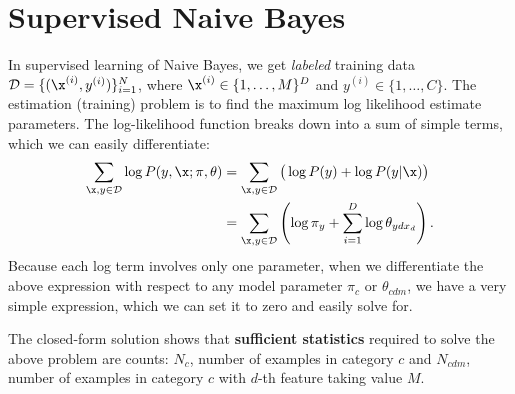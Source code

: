 \documentclass{discussion}
\begin{document}


\newcommand{\D}{\mathcal{D}}
\section{Supervised Naive Bayes}
In supervised learning of Naive Bayes, we get \emph{labeled} training data $\D = \{(\x^{(i)}, y^{(i)})\}_{i=1}^{N}$, where $\x^{(i)} \in \{1,\ldots,M\}^{D}$ and $y^{(i)} \in \{ 1,\ldots, C\}$. 
 The estimation (training) problem is to find the maximum log likelihood estimate parameters. The log-likelihood function breaks down into a sum of simple terms, which we can easily differentiate: 
\begin{align}
	\sum_{\x,y \in \mathcal{D}} \log P(y, \x; \pi, \theta)
	&= \sum_{\x,y \in \mathcal{D}} \big( \log P({y}) + \log P(y | \x)\big) \label{eq:mle} \\ 
	&= \sum_{\x,y \in \mathcal{D}} \left( \log \pi_{y} + \sum_{i=1}^{D}\log \theta_{ydx_d} \right). \label{eq:mle-param}
\end{align}
Because each log term involves only one parameter, when we differentiate the above expression with respect to any model parameter $\pi_c$ or $\theta_{cdm}$, we have a very simple expression, which we can set it to zero and easily solve for.

The closed-form solution shows that \textbf{sufficient statistics} required to solve the above problem are counts: $N_c$, number of examples in category $c$ and $N_{cdm}$, number of examples in category $c$ with $d$-th feature taking value $M$. 
\end{document}
